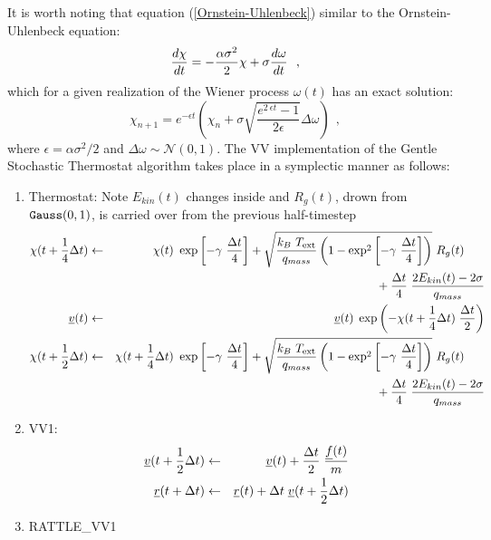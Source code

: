 It is worth noting that equation (\ref{Ornstein-Uhlenbeck}) similar
to the Ornstein-Uhlenbeck equation:
\begin{equation}
{d \chi \over dt} = -\frac{\alpha\sigma^{2}}{2}\chi + \sigma {d \omega \over dt}~~,
\end{equation}
which for a given realization of the Wiener process $\omega(t)$ has
an exact solution:
\begin{equation}
\chi_{n+1} = e^{-\epsilon t} \left( \chi_{n} + \sigma
\sqrt{\frac{e^{2~\epsilon t} - 1}{2 \epsilon}} \Delta \omega \right)~~,
\end{equation}
where $\epsilon = \alpha\sigma^{2}/2$ and $\Delta \omega \sim \mathcal{N}(0,1)$.
The VV implementation of the Gentle Stochastic Thermostat algorithm
takes place in a symplectic manner as follows:
\begin{enumerate}
\item Thermostat: Note $E_{kin}(t)$ changes inside and $R_{g}(t)$, drown from ${\tt Gauss}(0,1)$, is carried over from the previous half-timestep
\begin{eqnarray}
\chi (t + {1 \over 4} \Delta t) &\leftarrow& \chi (t) ~ \exp \left[-\gamma~{\Delta t \over 4} \right] +
\sqrt{\frac{k_{B}~T_{\rm ext}}{q_{mass}}\left(1-\exp^{2} \left[-\gamma~{\Delta t \over 4} \right]\right)}~R_{g}(t) \phantom{xxx} \nonumber \\
& &\phantom{xxxxxxxxxxxxxxxx} + {\Delta t \over 4} \; {{2 E_{kin}(t) - 2 \sigma} \over q_{mass}} \nonumber \\
\mbox{$\underline{v}$}(t) &\leftarrow& \mbox{$\underline{v}$}(t) \; \exp \left(
-\chi (t + {1 \over 4} \Delta t) \; {\Delta t \over 2} \right) \\
\chi (t + {1 \over 2} \Delta t) &\leftarrow& \chi (t + {1 \over 4} \Delta t) ~ \exp \left[-\gamma~{\Delta t \over 4} \right] +
\sqrt{\frac{k_{B}~T_{\rm ext}}{q_{mass}}\left(1-\exp^{2} \left[-\gamma~{\Delta t \over 4} \right]\right)}~R_{g}(t) \phantom{xxx} \nonumber \\
& &\phantom{xxxxxxxxxxxxxxxx} + {\Delta t \over 4} \; {{2 E_{kin}(t) - 2 \sigma} \over q_{mass}} \nonumber
\end{eqnarray}
\item VV1:
\begin{eqnarray}
\mbox{$\underline{v}$}(t + {1 \over 2} \Delta t) &\leftarrow& \mbox{$\underline{v}$}(t) +
{\Delta t \over 2} \; {\mbox{$\underline{f}$}(t) \over m} \nonumber \\
\mbox{$\underline{r}$}(t + \Delta t) &\leftarrow& \mbox{$\underline{r}$}(t) + \Delta t \;
\mbox{$\underline{v}$}(t + {1 \over 2} \Delta t)
\end{eqnarray}
\item RATTLE\_VV1

\end{enumerate}
